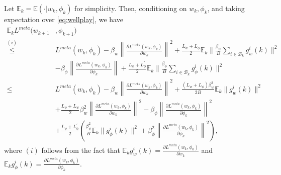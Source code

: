 \documentclass{osudissert96}
\begin{document}
Let $\mathbb{E}_k=\mathbb{E}(\cdot | w_k,\phi_k)$ for simplicity. Then, conditioning on $w_k,\phi_k$, and taking expectation over \cref{eq:wellplay}, we have 
\begin{align}\label{eq:diedie}
\mathbb{E}_k L^{meta}(w_{k+1}&,\phi_{k+1})  \nonumber
\\\overset{(i)}\leq&  L^{meta}(w_k,\phi_k) - \beta_w\left\| \frac{\partial L^{meta}(w_k,\phi_k)}{\partial w_k}\right\|^2 + \frac{L_w+L_\phi}{2} \mathbb{E}_k\Big\| \frac{\beta_w}{B}\sum_{i\in\mathcal{B}_k} g_{w}^i(k) \Big\|^2 \nonumber
\\ &-\beta_\phi\left\| \frac{\partial L^{meta}(w_{k},\phi_k)}{\partial \phi_k}  \right\| + \frac{L_\phi+L_\phi^\prime}{2} \mathbb{E}_k\Big\|\frac{\beta_\phi}{B}\sum_{i\in\mathcal{B}_k}g_{\phi}^i(k)\Big\|^2 \nonumber
\\\leq & L^{meta}(w_k,\phi_k) - \beta_w\left\| \frac{\partial L^{meta}(w_k,\phi_k)}{\partial w_k}\right\|^2 + \frac{(L_w+L_\phi)\beta_w^2}{2B}\mathbb{E}_k\big\|g_{w}^i(k) \big\|^2 \nonumber
\\ &+ \frac{L_\phi+L_w}{2}\beta_w^2 \left\| \frac{\partial L^{meta}(w_k,\phi_k)}{\partial w_k}\right\|^2-\beta_\phi\left\| \frac{\partial L^{meta}(w_{k},\phi_k)}{\partial \phi_k}  \right\|^2 \nonumber
\\&+ \frac{L_\phi+L_\phi^\prime}{2} \left(\frac{\beta_\phi^2}{B}\mathbb{E}_k\big\|g_{\phi}^i(k) \big\|^2 + \beta_\phi^2 \left\| \frac{\partial L^{meta}(w_k,\phi_k)}{\partial \phi_k}\right\|^2\right),
\end{align}
where $(i)$ follows from the fact that $\mathbb{E}_k g_w^i(k)= \frac{\partial L^{meta}(w_k,\phi_k)}{\partial w_k}$ and $\mathbb{E}_k g_\phi^i(k)= \frac{\partial L^{meta}(w_k,\phi_k)}{\partial \phi_k}$.
\end{document}
